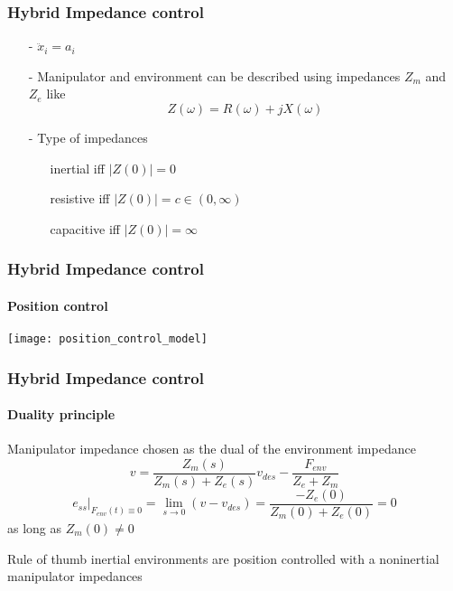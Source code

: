 \begin{frame}
  \frametitle{Hybrid Impedance control}
  \begin{itemize}
  \item[-] $\ddot{x}_i = a_i$
  \item[-] Manipulator and environment can be described using impedances $Z_m$ and $Z_e$ like
    \begin{equation*}
        Z(\omega) = R(\omega) + j X(\omega)
    \end{equation*}
  \item[-] Type of impedances
    \begin{itemize}
    \item[] inertial iff $|Z(0)| = 0$
    \item[] resistive iff $|Z(0)| = c \in (0, \infty)$
    \item[] capacitive iff $|Z(0)| = \infty$
    \end{itemize}
  \end{itemize}
\end{frame}
  
\begin{frame}
  \frametitle{Hybrid Impedance control}
  \framesubtitle{Position control}
  \centering
  \texttt{[image: position\_control\_model]}
\end{frame}

\begin{frame}
  \frametitle{Hybrid Impedance control}
  \framesubtitle{Duality principle}
  Manipulator impedance chosen as the dual of the environment impedance
  \begin{equation*}
    v = \frac{Z_m(s)}{Z_m(s) + Z_e(s)}v_{des} - \frac{F_{env}}{Z_e + Z_m}
  \end{equation*}
  \begin{equation*}
    e_{ss} \Big|_{F_{env}(t) \equiv 0} = \lim_{s \to 0}(v - v_{des}) = \frac{-Z_e(0)}{Z_m(0) + Z_e(0)} = 0
  \end{equation*}
  as long as $Z_m(0) \neq 0$  
  \begin{block}{Rule of thumb}
    inertial environments are position controlled with a noninertial manipulator impedances
  \end{block}
\end{frame}

